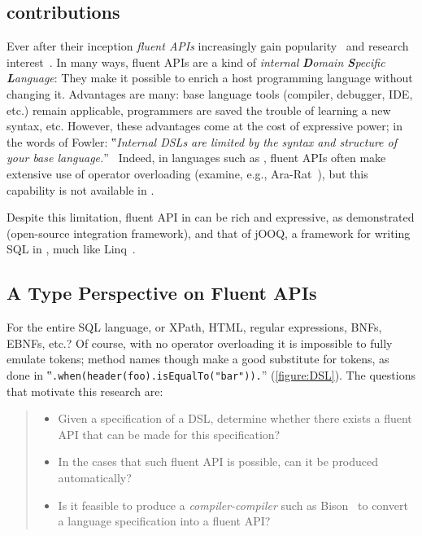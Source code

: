 \subsection{contributions}

Ever after their inception \emph{fluent APIs}
  increasingly gain popularity~\cite{Bauer:2005,Freeman:Pryce:06,Larsen:2012} and research
  interest~\cite{Deursen:2000,Kabanov:2008}.
In many ways, fluent APIs are a kind of
  \emph{internal} \emph{\textbf Domain \textbf Specific \textbf Language}:
They make it possible to enrich a host programming language without changing it.
Advantages are many: base language tools (compiler, debugger, IDE, etc.) remain
  applicable, programmers are saved the trouble of learning a new syntax, etc.
However, these advantages come at the cost of expressive power;
  in the words of Fowler:
  ‟\emph{Internal DSLs are limited by the syntax and structure of your base language.}”~\cite{Fowler:2005}
Indeed, in languages such as \CC, fluent APIs
  often make extensive use of operator overloading (examine, e.g., \textsf{Ara-Rat}~\cite{Gil:Lenz:07}),
  but this capability is not available in \Java.

Despite this limitation, fluent API in \Java can be rich and expressive, as demonstrated
(open-source integration framework),
and that of jOOQ, a framework for writing
  SQL in \Java, much like Linq~\cite{Meijer:Beckman:Bierman:06}.

\subsection{A Type Perspective on Fluent APIs}
For the entire SQL language,
or XPath, HTML, regular expressions, BNFs, EBNFs, etc.?
Of course, with no operator overloading it is impossible
to fully emulate tokens; method names though make a good substitute for tokens, as done
in ‟\lstinline{.when(header(foo).isEqualTo("bar")).}” (\cref{figure:DSL}).
The questions that motivate this research are:
\begin{quote}
  \begin{itemize}
    \item Given a specification of a DSL, determine whether there exists
        a fluent API that can be made for this specification?
    \item In the cases that such fluent API is possible,
      can it be produced automatically?
    \item Is it feasible to produce a \emph{compiler-compiler} such as Bison~\cite{Bison:manual}
        to convert a language specification into a fluent API?
\end{itemize}
\end{quote}


